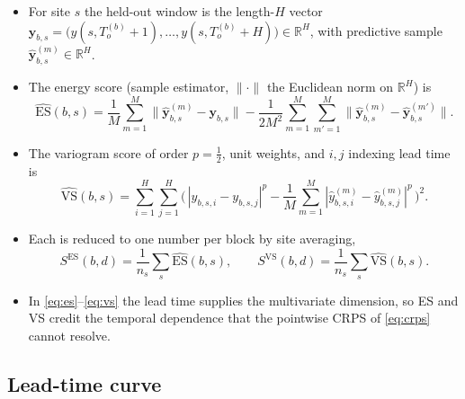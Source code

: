 \documentclass[11pt]{article}
\newcommand{\R}{\mathbb{R}}
\begin{document}
\begin{itemize}[leftmargin=1.4em]
  \item For site $s$ the held-out window is the length-$H$ vector
        $\bm y_{b,s} = \big(y(s,T_o^{(b)}+1),\dots,y(s,T_o^{(b)}+H)\big)
        \in\R^H$, with predictive sample
        $\hat{\bm y}^{(m)}_{b,s}\in\R^H$.
  \item The energy score (sample estimator, $\|\cdot\|$ the Euclidean
        norm on $\R^H$) is
        \begin{equation}
          \widehat{\mathrm{ES}}(b,s)
          = \frac1M\sum_{m=1}^M
              \big\|\hat{\bm y}^{(m)}_{b,s} - \bm y_{b,s}\big\|
          - \frac1{2M^2}\sum_{m=1}^M\sum_{m'=1}^M
              \big\|\hat{\bm y}^{(m)}_{b,s}
                    - \hat{\bm y}^{(m')}_{b,s}\big\| .
          \label{eq:es}
        \end{equation}
  \item The variogram score of order $p=\tfrac12$, unit weights, and
        $i,j$ indexing lead time is
        \begin{equation}
          \widehat{\mathrm{VS}}(b,s)
          = \sum_{i=1}^H\sum_{j=1}^H
            \Big(\,
              |y_{b,s,i}-y_{b,s,j}|^{p}
              - \frac1M\sum_{m=1}^M
                |\hat y^{(m)}_{b,s,i}-\hat y^{(m)}_{b,s,j}|^{p}
            \,\Big)^2 .
          \label{eq:vs}
        \end{equation}
  \item Each is reduced to one number per block by site averaging,
        \begin{equation}
          S^{\mathrm{ES}}(b,d) = \frac1{n_s}\sum_{s}\widehat{\mathrm{ES}}(b,s),
          \qquad
          S^{\mathrm{VS}}(b,d) = \frac1{n_s}\sum_{s}\widehat{\mathrm{VS}}(b,s).
          \label{eq:joint-block}
        \end{equation}
  \item In \eqref{eq:es}--\eqref{eq:vs} the lead time supplies the
        multivariate dimension, so ES and VS credit the temporal
        dependence that the pointwise CRPS of \eqref{eq:crps} cannot
        resolve.
\end{itemize}

\subsection{Lead-time curve}
\end{document}
